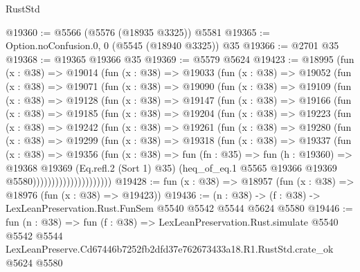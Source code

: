 \begin{lexlean}{RustStd}
\begin{coremodule}
@19360 := @5566 (@5576 (@18935 @3325)) @5581
@19365 := Option.noConfusion.{0, 0} (@5545 (@18940 @3325)) @35
@19366 := @2701 @35
@19368 := @19365 @19366 @35
@19369 := @5579 @5624
@19423 := @18995
    (fun (x : @38) =>
    @19014
      (fun (x : @38) =>
      @19033
        (fun (x : @38) =>
        @19052
          (fun (x : @38) =>
          @19071
            (fun (x : @38) =>
            @19090
              (fun (x : @38) =>
              @19109
                (fun (x : @38) =>
                @19128
                  (fun (x : @38) =>
                  @19147
                    (fun (x : @38) =>
                    @19166
                      (fun (x : @38) =>
                      @19185
                        (fun (x : @38) =>
                        @19204
                          (fun (x : @38) =>
                          @19223
                            (fun (x : @38) =>
                            @19242
                              (fun (x : @38) =>
                              @19261
                                (fun (x : @38) =>
                                @19280
                                  (fun (x : @38) =>
                                  @19299
                                    (fun (x : @38) =>
                                    @19318
                                      (fun (x : @38) =>
                                      @19337
                                        (fun (x : @38) =>
                                        @19356
                                          (fun (x : @38) =>
                                          fun (fn : @35) =>
                                          fun (h : @19360) =>
                                          @19368
                                            @19369
                                            (Eq.refl.{2} (Sort 1) @35)
                                            (heq_of_eq.{1}
                                              @5565
                                              @19366
                                              @19369
                                              @5580)))))))))))))))))))))
@19428 := fun (x : @38) => @18957 (fun (x : @38) => @18976 (fun (x : @38) => @19423))
@19436 := (n : @38) -> (f : @38) -> LexLeanPreservation.Rust.FunSem @5540 @5542 @5544 @5624 @5580
@19446 := fun (n : @38) =>
  fun (f : @38) =>
  LexLeanPreservation.Rust.simulate
    @5540
    @5542
    @5544
    LexLeanPreserve.Cd67446b7252fb2dfd37e762673433a18.R1.RustStd.crate_ok
    @5624
    @5580
\end{coremodule}
\end{lexlean}
